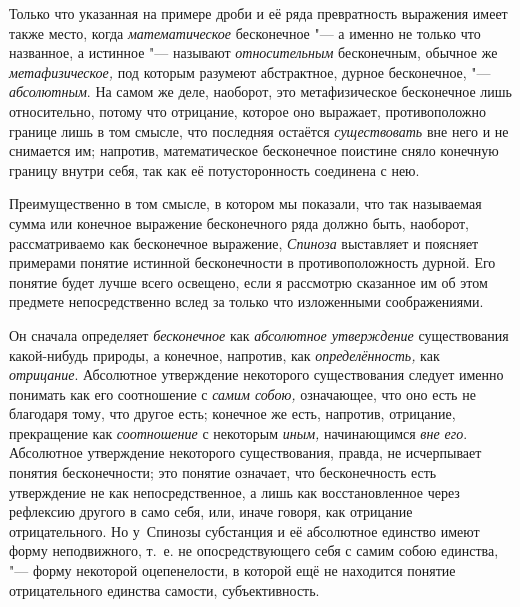Только что указанная на примере дроби и её ряда превратность выражения имеет
также место, когда {\em математическое} бесконечное "--- а именно не только что
названное, а истинное "--- называют {\em относительным} бесконечным,
обычное же {\em метафизическое,} под которым разумеют абстрактное,
дурное бесконечное, "--- {\em абсолютным}. На самом же деле, наоборот, это
метафизическое бесконечное лишь относительно, потому что отрицание, которое оно
выражает, противоположно границе лишь в том смысле, что последняя остаётся
{\em существовать} вне него и не снимается им; напротив, математическое
бесконечное поистине сняло конечную границу внутри себя, так как её
потусторонность соединена с нею.\label{bkm:bm52b}

Преимущественно в том смысле, в котором мы показали, что так называемая сумма
или конечное выражение бесконечного ряда должно быть, наоборот, рассматриваемо
как бесконечное выражение, {\em Спиноза} выставляет и поясняет примерами
понятие истинной бесконечности в противоположность дурной. Его понятие будет
лучше всего освещено, если я рассмотрю сказанное им об этом предмете
непосредственно вслед за только что изложенными соображениями.

Он сначала определяет {\em бесконечное} как {\em абсолютное утверждение}
существования какой-нибудь природы, а конечное, напротив, как
{\em определённость,} как {\em отрицание}. Абсолютное утверждение некоторого
существования следует именно понимать как его соотношение с {\em самим собою,}
означающее, что оно есть не благодаря тому, что другое есть; конечное же есть,
напротив, отрицание, прекращение как {\em соотношение} с некоторым
{\em иным,} начинающимся {\em вне его}. Абсолютное утверждение некоторого
существования, правда, не исчерпывает понятия бесконечности; это понятие
означает, что бесконечность есть утверждение не как непосредственное, а лишь
как восстановленное через рефлексию другого в само себя, или, иначе говоря, как
отрицание отрицательного. Но у~Спинозы субстанция и её абсолютное единство
имеют форму неподвижного, т.~е. не опосредствующего себя с самим собою
единства, "--- форму некоторой оцепенелости, в которой ещё не находится понятие
отрицательного единства самости, субъективность.

